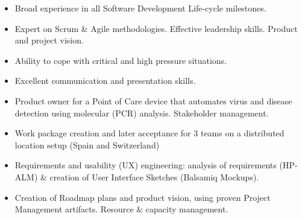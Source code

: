 \documentclass[10pt,a4paper]{altacv}
\begin{document}

\begin{fullwidth}
\makecvheader
\end{fullwidth}


\begin{itemize} 
	\item Broad experience in all Software Development Life-cycle milestones.
	\item Expert on Scrum \& Agile methodologies. Effective leadership skills. Product and project vision.
	\item Ability to cope with critical and high pressure situations.              
	\item Excellent communication and presentation skills.
\end{itemize}

\medskip


\begin{itemize}
	\item Product owner for a Point of Care device that automates virus and disease detection using molecular (PCR) analysis. Stakeholder management.
	\item Work package creation and later acceptance for 3 teams on a distributed location setup (Spain and Switzerland)
	\item Requirements and usability (UX) engineering: analysis of requirements (HP-ALM) \& creation of User Interface Sketches (Balsamiq Mockups).
	\item Creation of Roadmap plans and product vision, using proven Project Management artifacts. Resource \& capacity management.
\end{itemize}
\end{document}

